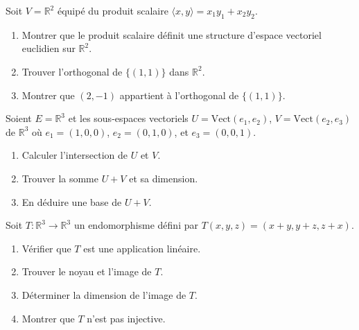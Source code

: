 \begin{exercice}
Soit \( V = \mathbb{R}^2 \) équipé du produit scalaire \( \langle x, y \rangle = x_1 y_1 + x_2 y_2 \).
\begin{enumerate}
    \item Montrer que le produit scalaire définit une structure d’espace vectoriel euclidien sur \( \mathbb{R}^2 \).
    \item Trouver l'orthogonal de \( \{(1, 1)\} \) dans \( \mathbb{R}^2 \).
    \item Montrer que \( (2, -1) \) appartient à l'orthogonal de \( \{(1, 1)\} \).
\end{enumerate}
\end{exercice}

\begin{exercice}
Soient \( E = \mathbb{R}^3 \) et les sous-espaces vectoriels \( U = \text{Vect}(e_1, e_2) \), \( V = \text{Vect}(e_2, e_3) \) de \( \mathbb{R}^3 \) où \( e_1 = (1, 0, 0) \), \( e_2 = (0, 1, 0) \), et \( e_3 = (0, 0, 1) \).
\begin{enumerate}
    \item Calculer l'intersection de \( U \) et \( V \).
    \item Trouver la somme \( U + V \) et sa dimension.
    \item En déduire une base de \( U + V \).
\end{enumerate}
\end{exercice}

\begin{exercice}
Soit \( T : \mathbb{R}^3 \to \mathbb{R}^3 \) un endomorphisme défini par \( T(x, y, z) = (x + y, y + z, z + x) \).
\begin{enumerate}
    \item Vérifier que \( T \) est une application linéaire.
    \item Trouver le noyau et l'image de \( T \).
    \item Déterminer la dimension de l'image de \( T \).
    \item Montrer que \( T \) n'est pas injective.
\end{enumerate}
\end{exercice}

